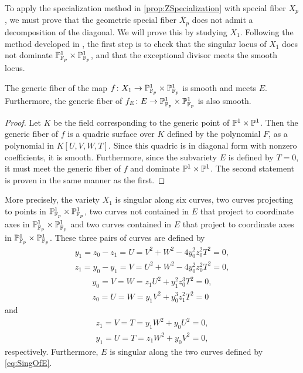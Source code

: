 To apply the specialization method in \cref{prop:ZSpecialization} with special fiber $X_p$, we must prove that the geometric special fiber $\overline{X}_p$ does not admit a decomposition of the diagonal. We will prove this by studying $X_1$. Following the method developed in \cite{SchreiederHypersurface}, the first step is to check that the singular locus of $X_1$ does not dominate $\P_{\F_p}^1 \times \P_{\F_p}^1$, and that the exceptional divisor meets the smooth locus.
\begin{lemma}
  \label{lem:GenericFiberSmooth}
  The generic fiber of the map $f \from X_1 \to \P_{\F_p}^1 \times \P_{\F_p}^1$ is smooth and meets $E$. Furthermore, the generic fiber of $f_E \from E \to \P_{\F_p}^1 \times \P_{\F_p}^1$ is also smooth.
\end{lemma}
\begin{proof}
  Let $K$ be the field corresponding to the generic point of $\P^1 \times \P^1$. Then the generic fiber of $f$ is a quadric surface over $K$ defined by the polynomial $F$, as a polynomial in $K[U,V,W,T]$. Since this quadric is in diagonal form with nonzero coefficients, it is smooth. Furthermore, since the subvariety $E$ is defined by $T=0$, it must meet the generic fiber of $f$ and dominate $\P^1 \times \P^1$. The second statement is proven in the same manner as the first.
\end{proof}


\begin{remark}
	\label{rem:SingularitiesOfX1}
  More precisely, the variety $X_1$ is singular along six curves, two curves projecting to points in $\P_{\F_p}^1 \times \P_{\F_p}^1$, two  curves not contained in $E$ that project to coordinate axes in $\P_{\F_p}^1 \times \P_{\F_p}^1$ and two curves contained in $E$ that project to coordinate axes in $\P_{\F_p}^1 \times \P_{\F_p}^1$. These three pairs of curves are defined by
\begin{equation}
\label{eq:VertCurves} 
\begin{gathered}
	y_1=z_0-z_1=U=V^2 + W^2 -4y_0^2z_0^2 T^2=0,\\
	z_1=y_0-y_1=V=U^2 + W^2 -4y_0^2z_0^2 T^2=0,
      \end{gathered}
\end{equation}
\begin{equation}
\label{eq:HorCurves}       
\begin{gathered}
  y_0=V=W=z_1U^2 + y_1^2z_0^3T^2=0,\\
  z_0=U=W=y_1V^2 + y_0^3z_1^2T^2=0
\end{gathered}
\end{equation}
and
\begin{equation}
  \label{eq:SingOfE}
\begin{gathered}
	z_1=V=T=y_1W^2+y_0U^2=0,\\
	y_1=U=T=z_1W^2+y_0V^2=0,
      \end{gathered}
\end{equation}      
respectively.
Furthermore, $E$ is singular along the two curves defined by \eqref{eq:SingOfE}.
\end{remark}


